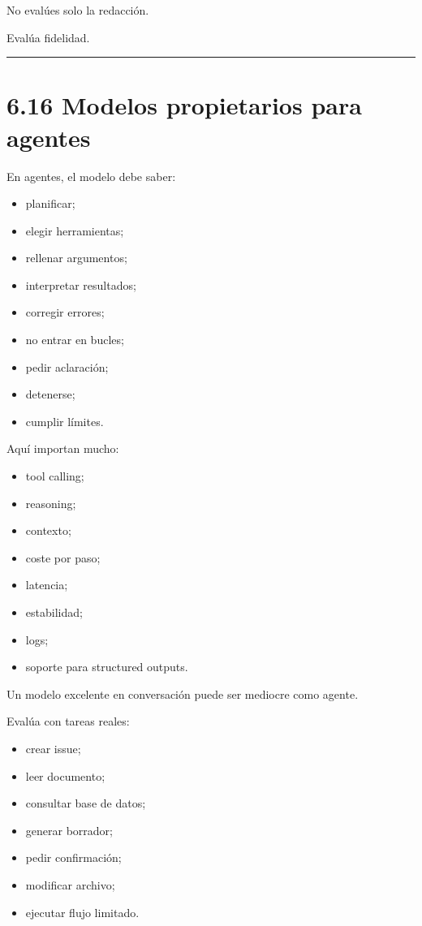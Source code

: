 No evalúes solo la redacción.

Evalúa fidelidad.

\begin{center}\rule{0.5\linewidth}{0.5pt}\end{center}

\section{6.16 Modelos propietarios para
agentes}\label{modelos-propietarios-para-agentes}

En agentes, el modelo debe saber:

\begin{itemize}
\tightlist
\item
  planificar;
\item
  elegir herramientas;
\item
  rellenar argumentos;
\item
  interpretar resultados;
\item
  corregir errores;
\item
  no entrar en bucles;
\item
  pedir aclaración;
\item
  detenerse;
\item
  cumplir límites.
\end{itemize}

Aquí importan mucho:

\begin{itemize}
\tightlist
\item
  tool calling;
\item
  reasoning;
\item
  contexto;
\item
  coste por paso;
\item
  latencia;
\item
  estabilidad;
\item
  logs;
\item
  soporte para structured outputs.
\end{itemize}

Un modelo excelente en conversación puede ser mediocre como agente.

Evalúa con tareas reales:

\begin{itemize}
\tightlist
\item
  crear issue;
\item
  leer documento;
\item
  consultar base de datos;
\item
  generar borrador;
\item
  pedir confirmación;
\item
  modificar archivo;
\item
  ejecutar flujo limitado.
\end{itemize}

